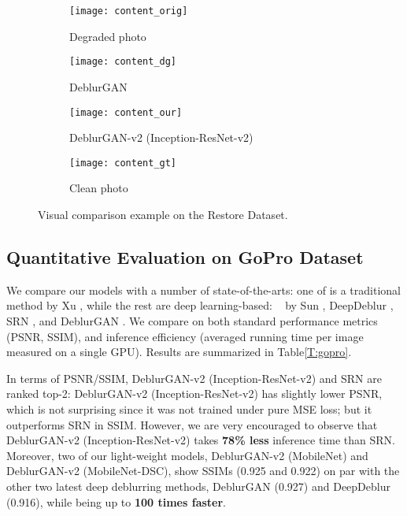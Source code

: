 \documentclass[10pt,twocolumn,letterpaper]{article}
\begin{document}
 \begin{figure*}[htb]
 \vspace{-1em}
	\centering
    \captionsetup{justification=centering}
    \begin{subfigure}[t]{0.24\textwidth}
        \texttt{[image: content\_orig]}
        \caption{Degraded photo}
        \label{fig:rest_input}
    \end{subfigure}
    \begin{subfigure}[t]{0.24\textwidth}
        \texttt{[image: content\_dg]}
        \caption{DeblurGAN}
        \label{fig:rest_dg}
    \end{subfigure}
    \begin{subfigure}[t]{0.24\textwidth}
        \texttt{[image: content\_our]}
        \caption{DeblurGAN-v2 \footnotesize{(Inception-ResNet-v2)}}
        \label{fig:rest_our}
    \end{subfigure}
    \begin{subfigure}[t]{0.24\textwidth}
        \texttt{[image: content\_gt]}
        \caption{Clean photo}
        \label{fig:rest_gt}
    \end{subfigure}
    \vspace{-1em}
    \caption{Visual comparison example on the Restore Dataset.}
        \vspace{-1.2em}
    \label{fig:yolo}
\end{figure*}



\subsection{Quantitative Evaluation on GoPro Dataset}
\vspace{-0.5em}




We compare our models with a number of state-of-the-arts: one of is a traditional method by Xu \etal \cite{XuUnnaturalDeblurring}, while the rest are deep learning-based: ~\cite{SunLearningRemoval} by Sun \etal, DeepDeblur \cite{Nah2016DeepDeblurring}, SRN \cite{tao2018scale}, and DeblurGAN \cite{kupyn2018deblurgan}. We compare on both standard performance metrics (PSNR, SSIM), and inference efficiency (averaged running time per image measured on a single GPU). Results are summarized in Table\ref{T:gopro}. 

In terms of PSNR/SSIM, DeblurGAN-v2 (Inception-ResNet-v2) and SRN are ranked top-2: DeblurGAN-v2 (Inception-ResNet-v2) has slightly lower PSNR, which is not surprising since it was not trained under pure MSE loss; but it outperforms SRN in SSIM. However, we are very encouraged to observe that DeblurGAN-v2 (Inception-ResNet-v2) takes \textbf{78\% less} inference time than SRN. Moreover, two of our light-weight models, DeblurGAN-v2 (MobileNet) and DeblurGAN-v2 (MobileNet-DSC), show SSIMs (0.925 and 0.922) on par with the other two latest deep deblurring methods, DeblurGAN (0.927) and DeepDeblur (0.916), while being up to \textbf{100 times faster}. 
\end{document}
